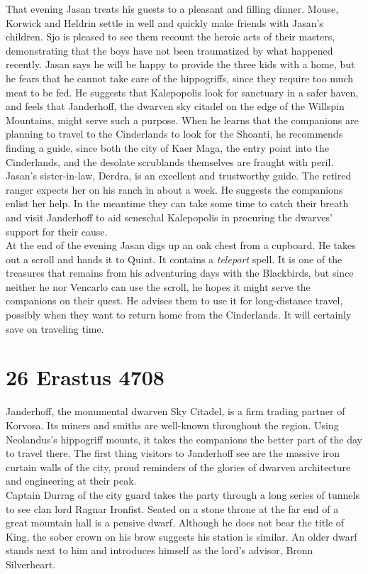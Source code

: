 That evening Jasan treats his guests to a pleasant and filling dinner. Mouse, Korwick and Heldrin settle in well and quickly make friends with Jasan's children. Sjo is pleased to see them recount the heroic acts of their masters, demonstrating that the boys have not been traumatized by what happened recently. Jasan says he will be happy to provide the three kids with a home, but he fears that he cannot take care of the hippogriffs, since they require too much meat to be fed. He suggests that Kalepopolis look for sanctuary in a safer haven, and feels that Janderhoff, the dwarven sky citadel on the edge of the Willspin Mountains, might serve such a purpose. When he learns that the companions are planning to travel to the Cinderlands to look for the Shoanti, he recommends finding a guide, since both the city of Kaer Maga, the entry point into the Cinderlands, and the desolate scrublands themselves are fraught with peril. Jasan's sister-in-law, Derdra, is an excellent and trustworthy guide. The retired ranger expects her on his ranch in about a week. He suggests the companions enlist her help. In the meantime they can take some time to catch their breath and visit Janderhoff to aid seneschal Kalepopolis in procuring the dwarves' support for their cause.\\

At the end of the evening Jasan digs up an oak chest from a cupboard. He takes out a scroll and hands it to Quint. It contains a {\itshape teleport} spell. It is one of the treasures that remains from his adventuring days with the Blackbirds, but since neither he nor Vencarlo can use the scroll, he hopes it might serve the companions on their quest. He advises them to use it for long-distance travel, possibly when they want to return home from the Cinderlands. It will certainly save on traveling time. \section{26 Erastus 4708}

Janderhoff, the monumental dwarven Sky Citadel, is a firm trading partner of Korvosa. Its miners and smiths are well-known throughout the region. Using Neolandus's hippogriff mounts, it takes the companions the better part of the day to travel there. The first thing visitors to Janderhoff see are the massive iron curtain walls of the city, proud reminders of the glories of dwarven architecture and engineering at their peak.\\

Captain Durrag of the city guard takes the party through a long series of tunnels to see clan lord Ragnar Ironfist. Seated on a stone throne at the far end of a great mountain hall is a pensive dwarf. Although he does not bear the title of King, the sober crown on his brow suggests his station is similar. An older dwarf stands next to him and introduces himself as the lord's advisor, Bronn Silverheart.\\

